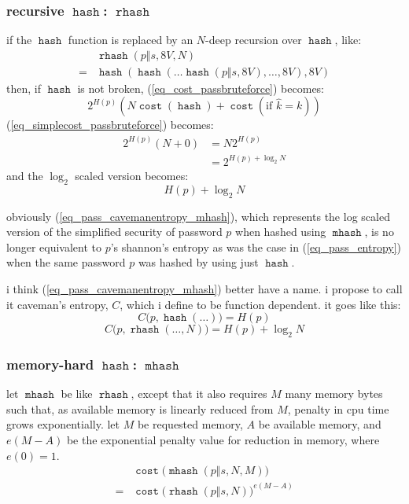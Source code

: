 \documentclass[twocolumn]{article}
\DeclareMathOperator{\hash}{\mathtt{hash}}
\DeclareMathOperator{\rhash}{\mathtt{rhash}}
\DeclareMathOperator{\mhash}{\mathtt{mhash}}
\DeclareMathOperator{\cost}{\mathtt{cost}}
\begin{document}
\subsubsection{recursive $\hash$: $\rhash$}
if the $\hash$ function is replaced by an $N$-deep recursion over $\hash$,
like:
\[
    \begin{split}
        & \rhash(p \Vert s, 8V, N) \\
    ={} &  \hash(\hash(\ldots\hash(p \Vert s, 8V), \ldots, 8V), 8V)
    \end{split}
\]
then, if $\hash$ is not broken,  (\ref{eq_cost_passbruteforce}) becomes:
\begin{equation}\label{eq_cost_passbruteforce_N}
    2^{H(p)} \left(
        N\cost(\hash) + \cost(\text{if } \hat k = k)
    \right)
\end{equation}
(\ref{eq_simplecost_passbruteforce}) becomes:
\begin{equation}\label{eq_simplecost_passbruteforce_N}
    \begin{split}
    2^{H(p)} (N+0) &= N2^{H(p)} \\
                  &= 2^{H(p) + \log_2 N}
    \end{split}
\end{equation}
and the $\log_2$ scaled version becomes:
\begin{equation}\label{eq_pass_cavemanentropy_mhash}
    H(p) + \log_2 N
\end{equation}

obviously (\ref{eq_pass_cavemanentropy_mhash}), which represents the log
scaled version of the simplified security of password $p$ when hashed using
$\mhash$, is no longer equivalent to $p$'s shannon's entropy as was the
case in (\ref{eq_pass_entropy}) when the same password $p$ was hashed by
using just $\hash$.

i think (\ref{eq_pass_cavemanentropy_mhash}) better have a name.  i propose
to call it caveman's entropy, $C$, which i define to be function dependent.
it goes like this:
\begin{equation}
    C\Big(p, \hash(\ldots)\Big) = H(p)
\end{equation}
\begin{equation}
    C\Big(p, \rhash(\ldots, N)\Big) = H(p) + \log_2 N
\end{equation}

\subsubsection{memory-hard $\hash$: $\mhash$}
let $\mhash$ be like $\rhash$, except that it also requires $M$ many memory
bytes such that, as available memory is linearly reduced from $M$, penalty
in cpu time grows exponentially.  let $M$ be requested memory, $A$ be
available memory, and $e(M - A)$ be the exponential penalty value for
reduction in memory, where $e(0) = 1$.
\begin{equation}
    \begin{split}
        & \cost\Big(\mhash(p \Vert s, N, M)\Big) \\
    ={} & \cost\Big(\rhash(p \Vert s, N)\Big)^{e(M-A)}
    \end{split}
\end{equation}
\end{document}
